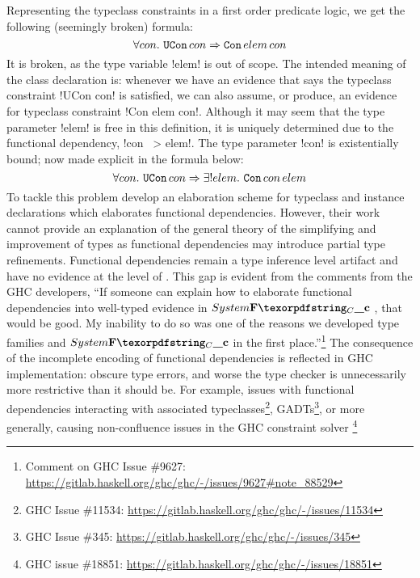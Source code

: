 \documentclass[screen,nonacm,manuscript,review]{acmart} %
\begin{document}
Representing the typeclass constraints in a first order predicate logic, we get the following
(seemingly broken) formula:
\[
\forall con.~\texttt{UCon}\, con \Rightarrow \texttt{Con}\, elem\, con
\]
It is broken, as the type variable !elem! is out of scope.
The intended meaning of the class declaration is:
whenever we have an evidence that says the typeclass constraint
!UCon con! is satisfied, we can also assume, or produce, an
evidence for typeclass constraint !Con elem con!.
Although it may seem that the type parameter
!elem! is free in this definition, it is uniquely
determined due to the functional dependency, !con ~> elem!.
The type parameter !con! is existentially
bound; now made explicit in the formula below:
\[
\forall con.~\texttt{UCon}\, con \Rightarrow \exists! elem.~\texttt{Con}\, con\, elem
\]
To tackle this problem \citet{karachalias_elaboration_2017} develop an
elaboration scheme for typeclass and instance declarations which
elaborates functional dependencies. However,
their work cannot provide an explanation of the general theory of
the simplifying and improvement of types\cite{jones_simplifying_1995}
as functional dependencies may introduce partial type
refinements. Functional dependencies remain a type inference level
artifact and have no evidence at the level of \SFC. This gap is evident
from the comments from the GHC developers, ``If someone can explain how to
elaborate functional dependencies into well-typed evidence in $\SFC$
, that would be good. My inability to do so was one of the reasons
we developed type families and $\SFC$ in the first
place.''\footnote{Comment on GHC Issue \#9627:
  \url{https://gitlab.haskell.org/ghc/ghc/-/issues/9627\#note\_88529}}
The consequence of the incomplete encoding of functional
dependencies is reflected in GHC implementation:
obscure type errors, and worse the type checker is unnecessarily more
restrictive than it should be. For example, issues with functional
dependencies interacting with associated typeclasses\footnote{GHC Issue \#11534:
  \url{https://gitlab.haskell.org/ghc/ghc/-/issues/11534}},
GADTs\footnote{GHC Issue \#345:
  \url{https://gitlab.haskell.org/ghc/ghc/-/issues/345}},
or more generally, causing non-confluence issues in the GHC constraint
solver \footnote{GHC issue \#18851:
  \url{https://gitlab.haskell.org/ghc/ghc/-/issues/18851}}
\end{document}
